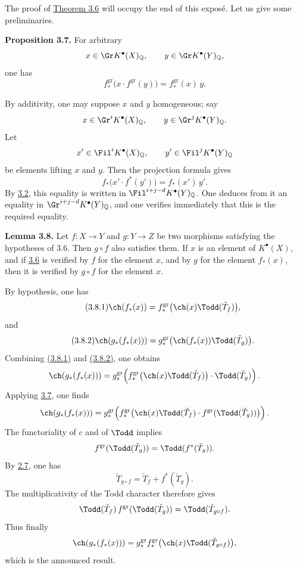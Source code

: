 The proof of \hyperlink{sga6.e08.thm.3-6}{Theorem 3.6} will occupy the end of this exposé. Let us give some preliminaries.

\textbf{Proposition 3.7.} For arbitrary
\[
x\in \Gr K^{\bullet}(X)_{\mathbb Q},\qquad
y\in \Gr K^{\bullet}(Y)_{\mathbb Q},
\]
one has
\[
 f^{\mathrm{gr}}_*\bigl(x\cdot f^{\mathrm{gr}}(y)\bigr)
 =
 f^{\mathrm{gr}}_*(x)\,y .
\]

By additivity, one may suppose \(x\) and \(y\) homogeneous; say
\[
x\in \Gr^iK^{\bullet}(X)_{\mathbb Q},\qquad
y\in \Gr^jK^{\bullet}(Y)_{\mathbb Q}.
\]
Let
\[
x'\in \Fil^iK^{\bullet}(X)_{\mathbb Q},\qquad
y'\in \Fil^jK^{\bullet}(Y)_{\mathbb Q}
\]
be elements lifting \(x\) and \(y\). Then the projection formula gives
\[
 f_*\bigl(x'\cdot f^*(y')\bigr)=f_*(x')\,y'.
\]
By \hyperlink{sga6.e08.prop.3-2}{3.2}, this equality is written in
\(\Fil^{i+j-d}K^{\bullet}(Y)_{\mathbb Q}\). One deduces from it an equality in
\(\Gr^{i+j-d}K^{\bullet}(Y)_{\mathbb Q}\), and one verifies immediately that this is the required equality.

\textbf{Lemma 3.8.} Let \(f:X\to Y\) and \(g:Y\to Z\) be two morphisms satisfying the hypotheses of 3.6. Then \(g\circ f\) also satisfies them. If \(x\) is an element of \(K^{\bullet}(X)\), and if \hyperlink{sga6.e08.thm.3-6}{3.6} is verified by \(f\) for the element \(x\), and by \(g\) for the element \(f_*(x)\), then it is verified by \(g\circ f\) for the element \(x\).

By hypothesis, one has
\begin{equation}\tag{3.8.1}
 \ch(f_*(x))=
 f^{\mathrm{gr}}_*\bigl(\ch(x)\Todd(\check T_f)\bigr),
\end{equation}
and
\begin{equation}\tag{3.8.2}
 \ch(g_*(f_*(x)))=
 g^{\mathrm{gr}}_*\bigl(\ch(f_*(x))\Todd(\check T_g)\bigr).
\end{equation}
Combining \hyperlink{sga6.e08.eq.3-8-1}{(3.8.1)} and \hyperlink{sga6.e08.eq.3-8-2}{(3.8.2)}, one obtains
\[
\ch(g_*(f_*(x)))=
g^{\mathrm{gr}}_*\!\left(
 f^{\mathrm{gr}}_*\bigl(\ch(x)\Todd(\check T_f)\bigr)\cdot \Todd(\check T_g)
\right).
\]
Applying \hyperlink{sga6.e08.prop.3-7}{3.7}, one finds
\[
\ch(g_*(f_*(x)))=
g^{\mathrm{gr}}_*\!\left(
 f^{\mathrm{gr}}_*\bigl(\ch(x)\Todd(\check T_f)\cdot
 f^{\mathrm{gr}}(\Todd(\check T_g))\bigr)
\right).
\]
The functoriality of \(c\) and of \(\Todd\) implies
\[
 f^{\mathrm{gr}}(\Todd(\check T_g))=\Todd(f^*(\check T_g)).
\]
By \hyperlink{sga6.e08.cor.2-7}{2.7}, one has
\[
 \check T_{g\circ f}=\check T_f+f^*(\check T_g).
\]
The multiplicativity of the Todd character therefore gives
\[
 \Todd(\check T_f)\,f^{\mathrm{gr}}(\Todd(\check T_g))
 =
 \Todd(\check T_{g\circ f}).
\]
Thus finally
\[
 \ch(g_*(f_*(x)))=
 g^{\mathrm{gr}}_* f^{\mathrm{gr}}_*\bigl(\ch(x)\Todd(\check T_{g\circ f})\bigr),
\]
which is the announced result.

